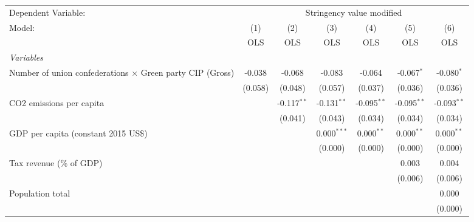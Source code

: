 
\begingroup
\centering
\begin{tabular}{lcccccc}
   \toprule
   Dependent Variable: & \multicolumn{6}{c}{Stringency value modified}\\
   Model:                                                           & (1)     & (2)           & (3)           & (4)           & (5)           & (6)\\  
                                                                    &  OLS    & OLS           & OLS           & OLS           & OLS           & OLS\\  
   \midrule
   \emph{Variables}\\
   Number of union confederations $\times$ Green party CIP (Gross)  & -0.038  & -0.068        & -0.083        & -0.064        & -0.067$^{*}$  & -0.080$^{*}$\\   
                                                                    & (0.058) & (0.048)       & (0.057)       & (0.037)       & (0.036)       & (0.036)\\   
   CO2 emissions per capita                                         &         & -0.117$^{**}$ & -0.131$^{**}$ & -0.095$^{**}$ & -0.095$^{**}$ & -0.093$^{**}$\\   
                                                                    &         & (0.041)       & (0.043)       & (0.034)       & (0.034)       & (0.034)\\   
   GDP per capita (constant 2015 US\$)                              &         &               & 0.000$^{***}$ & 0.000$^{**}$  & 0.000$^{**}$  & 0.000$^{**}$\\   
                                                                    &         &               & (0.000)       & (0.000)       & (0.000)       & (0.000)\\   
   Tax revenue (\% of GDP)                                          &         &               &               &               & 0.003         & 0.004\\   
                                                                    &         &               &               &               & (0.006)       & (0.006)\\   
   Population total                                                 &         &               &               &               &               & 0.000\\   
                                                                    &         &               &               &               &               & (0.000)\\   

\end{tabular}
